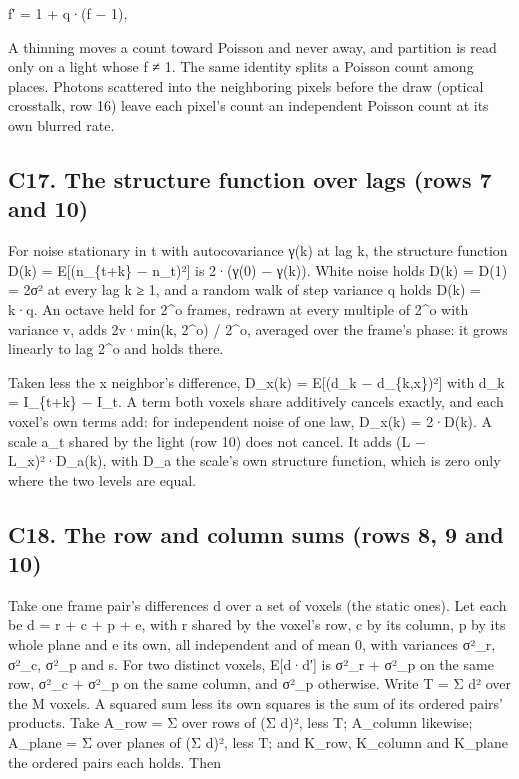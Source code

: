 f′ = 1 + q·(f − 1),

A thinning moves a count toward Poisson and never away, and partition is read only on a light whose f ≠ 1. The same identity splits a Poisson count among places. Photons scattered into the neighboring pixels before the draw (optical crosstalk, row 16) leave each pixel's count an independent Poisson count at its own blurred rate.

\subsection{\texorpdfstring{C17. The structure function over lags (rows 7 and 10)}{C17. The structure function over lags (rows 7 and 10)}}

For noise stationary in t with autocovariance γ(k) at lag k, the structure function D(k) = E[(n\_\allowbreak{}\{t+k\} − n\_\allowbreak{}t)²] is 2·(γ(0) − γ(k)). White noise holds D(k) = D(1) = 2σ² at every lag k ≥ 1, and a random walk of step variance q holds D(k) = k·q. An octave held for 2\textasciicircum{}o frames, redrawn at every multiple of 2\textasciicircum{}o with variance v, adds 2v·min(k, 2\textasciicircum{}o) / 2\textasciicircum{}o, averaged over the frame's phase: it grows linearly to lag 2\textasciicircum{}o and holds there.

Taken less the x neighbor's difference, D\_\allowbreak{}x(k) = E[(d\_\allowbreak{}k − d\_\allowbreak{}\{k,x\})²] with d\_\allowbreak{}k = I\_\allowbreak{}\{t+k\} − I\_\allowbreak{}t. A term both voxels share additively cancels exactly, and each voxel's own terms add: for independent noise of one law, D\_\allowbreak{}x(k) = 2·D(k). A scale a\_\allowbreak{}t shared by the light (row 10) does not cancel. It adds (L − L\_\allowbreak{}x)²·D\_\allowbreak{}a(k), with D\_\allowbreak{}a the scale's own structure function, which is zero only where the two levels are equal.

\subsection{\texorpdfstring{C18. The row and column sums (rows 8, 9 and 10)}{C18. The row and column sums (rows 8, 9 and 10)}}

Take one frame pair's differences d over a set of voxels (the static ones). Let each be d = r + c + p + e, with r shared by the voxel's row, c by its column, p by its whole plane and e its own, all independent and of mean 0, with variances σ²\_\allowbreak{}r, σ²\_\allowbreak{}c, σ²\_\allowbreak{}p and s. For two distinct voxels, E[d·d′] is σ²\_\allowbreak{}r + σ²\_\allowbreak{}p on the same row, σ²\_\allowbreak{}c + σ²\_\allowbreak{}p on the same column, and σ²\_\allowbreak{}p otherwise. Write T = Σ d² over the M voxels. A squared sum less its own squares is the sum of its ordered pairs' products. Take A\_\allowbreak{}row = Σ over rows of (Σ d)², less T; A\_\allowbreak{}column likewise; A\_\allowbreak{}plane = Σ over planes of (Σ d)², less T; and K\_\allowbreak{}row, K\_\allowbreak{}column and K\_\allowbreak{}plane the ordered pairs each holds. Then

